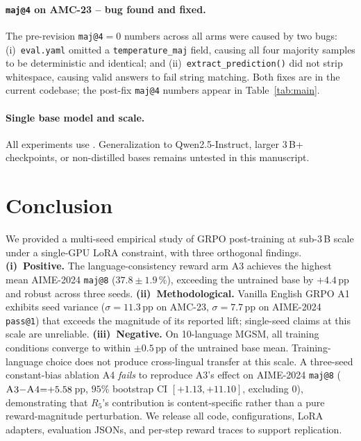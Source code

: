 \documentclass[11pt]{article}
\newcommand{\armA}{\textsc{A1}}
\newcommand{\armC}{\textsc{A3}}
\newcommand{\armD}{\textsc{A4}}
\newcommand{\R}[1]{R_{#1}}
\begin{document}
\paragraph{\texttt{maj@4} on AMC-23 -- bug found and fixed.}
The pre-revision \texttt{maj@4}$=0$ numbers across all arms were caused
by two bugs: (i)~\texttt{eval.yaml} omitted a \texttt{temperature\_maj}
field, causing all four majority samples to be deterministic and
identical; and (ii)~\texttt{extract\_prediction()} did not strip
whitespace, causing valid answers to fail string matching. Both fixes
are in the current codebase; the post-fix \texttt{maj@4} numbers appear
in Table~\ref{tab:main}.

\paragraph{Single base model and scale.}
All experiments use
.
Generalization to Qwen2.5-Instruct, larger 3\,B+ checkpoints, or
non-distilled bases remains untested in this manuscript.

\section{Conclusion}
\label{sec:conclusion}
We provided a multi-seed empirical study of GRPO post-training at
sub-3\,B scale under a single-GPU LoRA constraint, with three
orthogonal findings.
\textbf{(i)~Positive.} The language-consistency reward arm \armC{}
achieves the highest mean AIME-2024 \texttt{maj@8} ($37.8 \pm 1.9$\,\%),
exceeding the untrained base by $+4.4$\,pp and robust across three
seeds.
\textbf{(ii)~Methodological.} Vanilla English GRPO \armA{} exhibits seed
variance ($\sigma{=}11.3$\,pp on AMC-23, $\sigma{=}7.7$\,pp on
AIME-2024 \texttt{pass@1}) that exceeds the magnitude of its reported
lift; single-seed claims at this scale are unreliable.
\textbf{(iii)~Negative.} On 10-language MGSM, all training conditions
converge to within $\pm 0.5$\,pp of the untrained base mean.
Training-language choice does not produce cross-lingual transfer at
this scale.
A three-seed constant-bias ablation \armD{} \emph{fails} to reproduce
\armC{}'s effect on AIME-2024 \texttt{maj@8}
($\armC{}{-}\armD{}{=}{+}5.58$\,pp, $95\%$ bootstrap CI
$[+1.13, +11.10]$, excluding $0$), demonstrating that $\R{5}$'s
contribution is content-specific rather than a pure reward-magnitude
perturbation. We release all code, configurations, LoRA adapters,
evaluation JSONs, and per-step reward traces to support replication.
\end{document}
